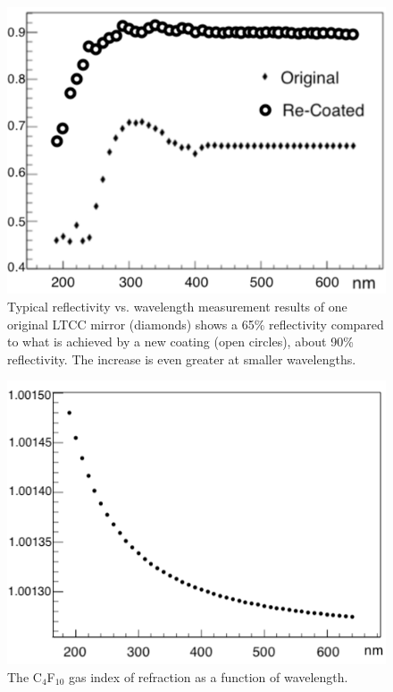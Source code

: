 \begin{figure}
	\centering
	\includegraphics[width=0.98\columnwidth, height=0.7\columnwidth]{img/reflectivityGain.png}
	\caption{Typical reflectivity vs. wavelength measurement results of one original LTCC mirror (diamonds)
          shows a 65\% reflectivity compared to what is achieved by a new coating (open circles), about 90\%
          reflectivity. The increase is even greater at smaller wavelengths.}
	\label{fig:reflectivityGain}
\end{figure}

\begin{figure}[b]
	\centering
	\includegraphics[width=0.98\columnwidth, height=0.65\columnwidth]{img/c4f10RefrIndex.png}
	\caption{The C$_4$F$_{10}$ gas index of refraction as a function of wavelength.}
	\label{fig:c4f10RefrIndex}
\end{figure}

